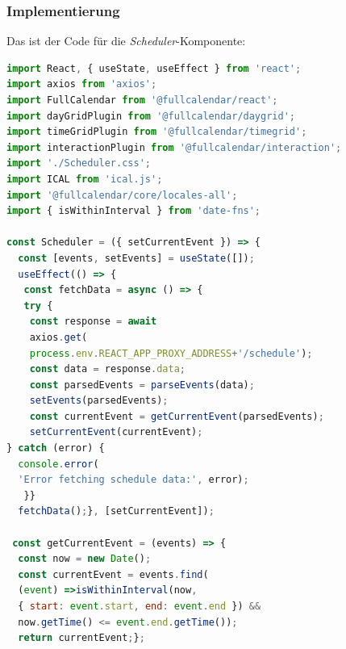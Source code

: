 \subsubsection{Implementierung}
Das ist der Code für die \emph{Scheduler}-Komponente:
\begin{lstlisting}[language=JavaScript,
	frame=single,           % Ein Rahmen um den Code
	framexleftmargin=15pt,  % Rahmen link von den Zahlen
	style=algoBericht,
	label={Scheduler-Komponente},
	captionpos=b ,          % Caption unter den Code setzen
	caption={Scheduler-Komponente}]
import React, { useState, useEffect } from 'react';
import axios from 'axios';
import FullCalendar from '@fullcalendar/react';
import dayGridPlugin from '@fullcalendar/daygrid';
import timeGridPlugin from '@fullcalendar/timegrid';
import interactionPlugin from '@fullcalendar/interaction';
import './Scheduler.css';
import ICAL from 'ical.js';
import '@fullcalendar/core/locales-all';
import { isWithinInterval } from 'date-fns';

const Scheduler = ({ setCurrentEvent }) => {
  const [events, setEvents] = useState([]);
  useEffect(() => {
   const fetchData = async () => {
   try {
    const response = await 
    axios.get(
    process.env.REACT_APP_PROXY_ADDRESS+'/schedule');
    const data = response.data;
    const parsedEvents = parseEvents(data);
    setEvents(parsedEvents);
    const currentEvent = getCurrentEvent(parsedEvents);
    setCurrentEvent(currentEvent);
} catch (error) {
  console.error(
  'Error fetching schedule data:', error);
   }}
  fetchData();}, [setCurrentEvent]);

 const getCurrentEvent = (events) => {
  const now = new Date();
  const currentEvent = events.find(
  (event) =>isWithinInterval(now, 
  { start: event.start, end: event.end }) &&
  now.getTime() <= event.end.getTime());
  return currentEvent;};


\end{lstlisting}
